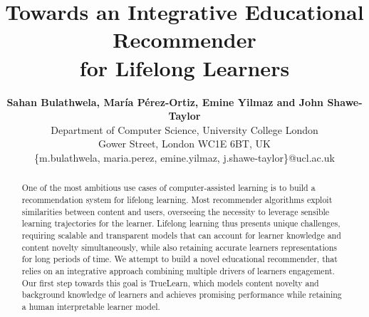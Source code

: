 \documentclass[letterpaper]{article} %
\title{Towards an Integrative Educational Recommender \\ for Lifelong Learners 
}
\author{
\Large \textbf{Sahan Bulathwela, Mar\'ia P\'erez-Ortiz, Emine Yilmaz and John Shawe-Taylor}\\ %
Department of Computer Science, University College London \\
Gower Street, London WC1E 6BT, UK\\ %
\{m.bulathwela, maria.perez, emine.yilmaz, j.shawe-taylor\}@ucl.ac.uk  %
}
\begin{document}
 \maketitle

\begin{abstract}

One of the most ambitious use cases of computer-assisted learning is to build a recommendation system for lifelong learning. Most recommender algorithms exploit similarities between content and users, overseeing the necessity to leverage sensible learning trajectories for the learner. Lifelong learning thus presents unique challenges, requiring scalable and transparent models that can account for learner knowledge and content novelty simultaneously, while also retaining accurate learners representations for long periods of time. We attempt to build a novel educational recommender, that relies on an integrative approach combining multiple drivers of learners engagement. Our first step towards this goal is TrueLearn, which models content novelty and background knowledge of learners and achieves promising performance while retaining a human interpretable learner model.


\end{abstract}
\end{document}
